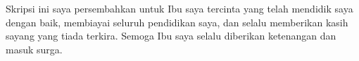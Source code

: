 \newpage

\begin{center}
    \vspace*{4cm}
    \large
    Skripsi ini saya persembahkan untuk Ibu saya tercinta yang telah mendidik saya dengan baik, membiayai seluruh pendidikan saya, dan selalu memberikan kasih sayang yang tiada terkira. Semoga Ibu saya selalu diberikan ketenangan dan masuk surga.
\end{center}
